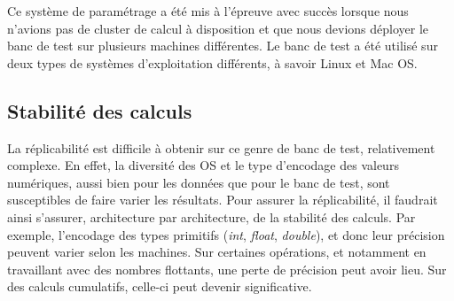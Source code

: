 Ce système de paramétrage a été mis à l'épreuve avec succès lorsque nous n'avions pas de cluster de calcul à disposition et que nous devions déployer le banc de test sur plusieurs machines différentes. Le banc de test a été utilisé sur deux types de systèmes d'exploitation différents, à savoir Linux et Mac OS.

\begin{table}[!t]
    \caption{Tableau récapitulant les propriétés de notre banc de test. Bien que reproductibles, certaines étapes nécessitent une modification manuelle en fonction des bases de données. Les * signifient que les résultats sont répétables dans le cas où l'on définit à l'avance les graines des générateurs aléatoires.}
    \label{ tab:reproductibility }
\end{table}

\subsection{Stabilité des calculs} 

La réplicabilité est difficile à obtenir sur ce genre de banc de test, relativement complexe. En effet, la diversité des OS et le type d'encodage des valeurs numériques, aussi bien pour les données que pour le banc de test, sont susceptibles de faire varier les résultats. Pour assurer la réplicabilité, il faudrait ainsi s'assurer, architecture par architecture, de la stabilité des calculs. Par exemple, l'encodage des types primitifs (\textit{int}, \textit{float}, \textit{double}), et donc leur précision peuvent varier selon les machines. Sur certaines opérations, et notamment en travaillant avec des nombres flottants, une perte de précision peut avoir lieu. Sur des calculs cumulatifs, celle-ci peut devenir significative.

